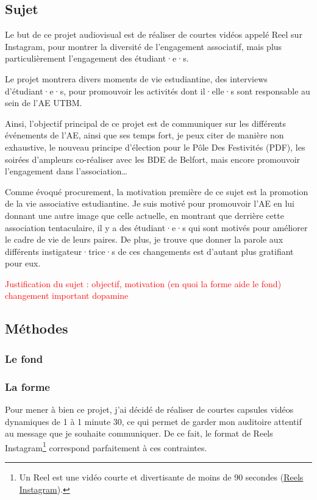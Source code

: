 
\subsection{Sujet}\label{subsec:sujet}

Le but de ce projet audiovisual est de réaliser de courtes vidéos appelé Reel sur Instagram, pour montrer la diversité de l'engagement associatif, mais plus particulièrement l'engagement des étudiant·e·s.

Le projet montrera divers moments de vie estudiantine, des interviews d'étudiant·e·s, pour promouvoir les activités dont il·elle·s sont responsable au sein de l'AE UTBM.

Ainsi, l'objectif principal de ce projet est de communiquer sur les différents événements de l'AE, ainsi que ses temps fort, je peux citer de manière non exhaustive, le nouveau principe d'élection pour le Pôle Des Festivités (PDF), les soirées d'ampleurs co-réaliser avec les BDE de Belfort, mais encore promouvoir l'engagement dans l'association\ldots

Comme évoqué procurement, la motivation première de ce sujet est la promotion de la vie associative estudiantine.
Je suis motivé pour promouvoir l'AE en lui donnant une autre image que celle actuelle, en montrant que derrière cette association tentaculaire, il y a des étudiant·e·s qui sont motivés pour améliorer le cadre de vie de leurs paires.
De plus, je trouve que donner la parole aux différents instigateur·trice·s de ces changements est d'autant plus gratifiant pour eux.

\textcolor{red}{Justification du sujet : objectif, motivation (en quoi la forme aide le fond) changement important dopamine}


\subsection{Méthodes}\label{subsec:methodes}


\subsubsection{Le fond}


\subsubsection{La forme}

Pour mener à bien ce projet, j'ai décidé de réaliser de courtes capsules vidéos dynamiques de 1 à 1 minute 30, ce qui permet de garder mon auditoire attentif au message que je souhaite communiquer.
De ce fait, le format de Reels Instagram\footnote{Un Reel est une vidéo courte et divertisante de moins de 90 secondes (\href{https://about.instagram.com/fr-fr/features/reels}{Reels Instagram}).} correspond parfaitement à ces contraintes.

